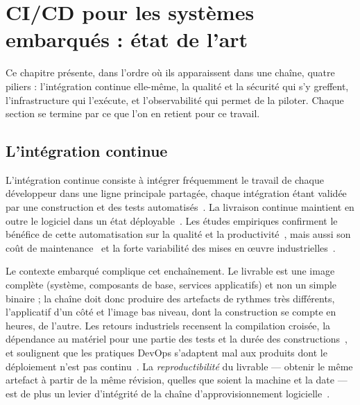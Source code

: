 \chapter{CI/CD pour les systèmes embarqués : état de l'art}
\label{chap:etat-art}

Ce chapitre présente, dans l'ordre où ils apparaissent dans une chaîne, quatre
piliers : l'intégration continue elle-même, la qualité et la sécurité qui s'y
greffent, l'infrastructure qui l'exécute, et l'observabilité qui permet de la
piloter. Chaque section se termine par ce que l'on en retient pour ce travail.

\section{L'intégration continue}
\label{sec:art-ci}

L'intégration continue consiste à intégrer fréquemment le travail de chaque
développeur dans une ligne principale partagée, chaque intégration étant
validée par une construction et des tests automatisés~\cite{fowler2006ci,duvall2007ci}.
La livraison continue maintient en outre le logiciel dans un état
déployable~\cite{humble2010cd}. Les études empiriques confirment le bénéfice de
cette automatisation sur la qualité et la productivité~\cite{vasilescu2015quality},
mais aussi son coût de maintenance~\cite{hilton2016usage} et la forte variabilité
des mises en œuvre industrielles~\cite{stahl2014modeling}.

\label{ssec:art-ci-embarque}
Le contexte embarqué complique cet enchaînement. Le livrable est une image
complète (système, composants de base, services applicatifs) et non un simple
binaire ; la chaîne doit donc produire des artefacts de rythmes très différents,
l'applicatif d'un côté et l'image bas niveau, dont la construction se compte en
heures, de l'autre. Les retours industriels recensent la compilation croisée, la
dépendance au matériel pour une partie des tests et la durée des
constructions~\cite{martensson2016embedded,shahin2017continuous}, et soulignent que
les pratiques DevOps s'adaptent mal aux produits dont le déploiement n'est pas
continu~\cite{lwakatare2019devops}. La \emph{reproductibilité} du livrable --- obtenir
le même artefact à partir de la même révision, quelles que soient la machine et
la date --- est de plus un levier d'intégrité de la chaîne d'approvisionnement
logicielle~\cite{lamb2022reproducible}.


